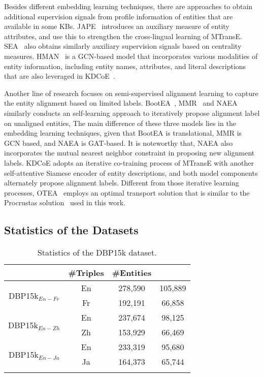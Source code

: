 \documentclass[11pt,a4paper]{article}
\def\bhline{\specialrule{.2em}{0em}{0em}}
\begin{document}
Besides different embedding learning techniques, there are approaches to obtain additional supervision signals from profile information of entities that are available in some KBs.
JAPE~\cite{sun2017cross} introduces an auxiliary measure of entity attributes, and use this to strengthen the cross-lingual learning of MTransE.
SEA~\cite{pei2019deg} also obtains similarly auxiliary supervision signals based on centrality measures.
HMAN~\cite{yang2019aligning} is a GCN-based model that incorporates various modalities of entity information, including entity names, attributes, and literal descriptions that are also leveraged in KDCoE~\cite{chen2018co}.


Another line of research focuses on semi-supervised alignment learning to capture the entity alignment based on limited labels.
BootEA~\cite{sun2018bootstrapping}, MMR~\cite{shi2019modeling} and NAEA~\cite{zhu2019neighborhood} similarly conducts an self-learning approach to iteratively propose alignment label on unaligned entities,
The main difference of these three models lies in the embedding learning techniques, given that BootEA is translational, MMR is GCN based, and NAEA is GAT-based.
It is noteworthy that, NAEA also incorporates the mutual nearest neighbor constraint in proposing new alignment labels.
KDCoE adopts an iterative co-training process of MTransE with another self-attentive Siamese encoder of entity descriptions,
and both model components alternately propose alignment labels.
Different from those iterative learning processes, OTEA~\cite{pei2019transport} employs an optimal transport solution that is similar to the Procrustas solution~\cite{schonemann1966procrustes} used in this work.



\subsection{Statistics of the Datasets}\label{sup:stats}


{
\begin{table}[h!]
\setlength\tabcolsep{2pt}
\centering
\scriptsize
\begin{tabular}{c|c|cc}
\bhline
\multicolumn{2}{c|}{Data}&\#Triples&\#Entities\\
\hline
\multirow{2}{*}{DBP15k$_{En-Fr}$}&En&278,590&105,889\\
&Fr&192,191&66,858\\
\hline
\multirow{2}{*}{DBP15k$_{En-Zh}$}&En&237,674&98,125\\
&Zh&153,929&66,469\\
\hline
\multirow{2}{*}{DBP15k$_{En-Ja}$}&En&233,319&95,680\\
&Ja&164,373&65,744\\
\bhline
\end{tabular}
\caption{Statistics of the DBP15k dataset.}\label{tbl:statdbp}
\end{table}
}
\end{document}
